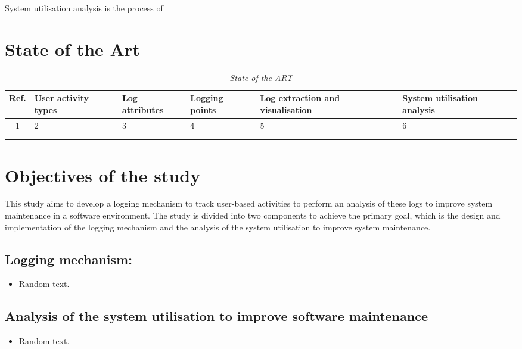 System utilisation analysis is the process of

\section{State of the Art}

\begin{table}[!htb]
	\centering
	\caption[State of the ART]
	{\textit{State of the ART}}
	\label{tbl:CH1_StateOfTheART}
	\begin{tabularx}{\textwidth}{|c|X|X|X|X|X|}
		\hline \textbf{Ref.} & \RaggedRight \textbf{User activity types} & \RaggedRight \textbf{Log attributes} & \RaggedRight \textbf{Logging points} & \RaggedRight \textbf{Log extraction and visualisation} & \textbf{System utilisation analysis} \\
		\hline 1 & 2 & 3 & 4 &  5 & 6 \\
		\hline \cite{Bekeneva2020} & \cmark & \cmark & \cmark & \cmark  & \cmark \\
		\hline \cite{Kocsis2012} & \xmark & \xmark & \xmark & \cmark & \cmark \\
		\hline
	\end{tabularx}
\end{table}

\clearpage

\section{Objectives of the study}
This study aims to develop a logging mechanism to track user-based activities to perform an analysis of these logs to improve system maintenance in a software environment. The study is divided into two components to achieve the primary goal, which is the design and implementation of the logging mechanism and the analysis of the system utilisation to improve system maintenance.

\subsection{Logging mechanism:}
\begin{itemize}
	\item Random text.
\end{itemize}

\subsection{Analysis of the system utilisation to improve software maintenance}
\begin{itemize}
	\item Random text.
\end{itemize}

